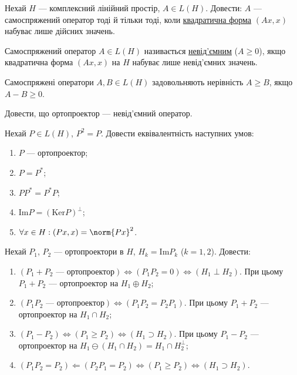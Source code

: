 \begin{exercise}
    Нехай $H$ --- комплексний лінійний простір, $A \in L(H)$. Довести: 
    $A$ --- самоспряжений оператор тоді й тільки тоді, коли 
    \uline{квадратична форма} $(Ax, x)$ набуває лише дійсних значень.
\end{exercise}

\begin{theory}
    Самоспряжений оператор $A \in L(H)$ називається \uline{невід'ємним} ($A \geq 0$),
    якщо квадратична форма $(Ax, x)$ на $H$ набуває лише невід'ємних значень.

    Самоспряжені оператори $A, B \in L(H)$ задовольняють нерівність $A \geq B$, якщо $A - B \geq 0$.
\end{theory}

\begin{exercise}
    Довести, що ортопроектор --- невід'ємний оператор.
\end{exercise}

\begin{exercise}
    Нехай $P \in L(H)$, $P^2 = P$. Довести еквівалентність наступних умов:
    \begin{enumerate}[label=\ukr*)]
        \item $P$ --- ортопроектор;
        \item $P = P^*$;
        \item $P P^* = P^* P$;
        \item $\mathrm{Im} P = (\mathrm{Ker} P)^\perp$;
        \item $\forall x \in H: (Px, x) = \norm{Px}^2$.
    \end{enumerate}
\end{exercise}

\begin{exercise}
    Нехай $P_1$, $P_2$ --- ортопроектори в $H$, $H_k = \mathrm{Im} P_k$ ($k = 1, 2$).
    Довести:
    \begin{enumerate}[label=\ukr*)]
        \item $(P_1 + P_2 \text{ --- ортопроектор}) \Leftrightarrow (P_1 P_2 = 0) \Leftrightarrow (H_1 \perp H_2)$.
        При цьому $P_1 + P_2$ --- ортопроектор на $H_1 \oplus H_2$;
        \item $(P_1 P_2 \text{ --- ортопроектор}) \Leftrightarrow (P_1 P_2 = P_2 P_1)$.
        При цьому $P_1 + P_2$ --- ортопроектор на $H_1 \cap H_2$;
        \item $(P_1 - P_2) \Leftrightarrow (P_1 \geq P_2) \Leftrightarrow (H_1 \supset H_2)$.
        При цьому $P_1 - P_2$ --- ортопроектор на $H_1 \ominus (H_1 \cap H_2) = H_1 \cap H_2^\perp$;
        \item $(P_1 P_2 = P_2) \Leftarrow (P_2 P_1 = P_2) \Leftrightarrow (P_1 \geq P_2) \Leftrightarrow (H_1 \supset H_2)$.
    \end{enumerate}
\end{exercise}

